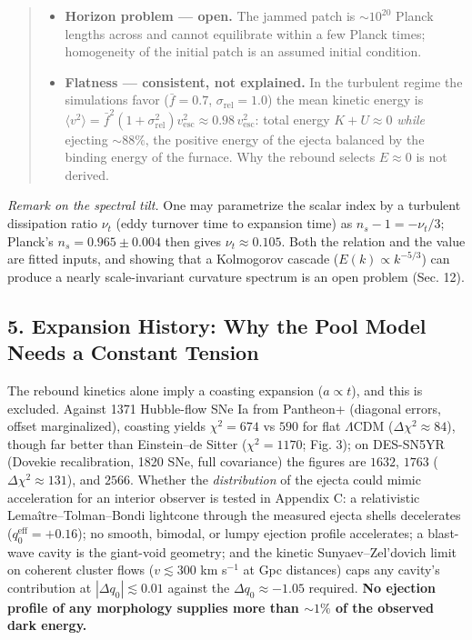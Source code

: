 \documentclass[
]{article}
\providecommand{\tightlist}{%
  \setlength{\itemsep}{0pt}\setlength{\parskip}{0pt}}
\begin{document}
\begin{quote}
\begin{itemize}
\tightlist
\item
  \textbf{Horizon problem --- open.} The jammed patch is
  \(\sim\!10^{20}\) Planck lengths across and cannot equilibrate within
  a few Planck times; homogeneity of the initial patch is an assumed
  initial condition.
\item
  \textbf{Flatness --- consistent, not explained.} In the turbulent
  regime the simulations favor (\(\bar{f} = 0.7\),
  \(\sigma_{\text{rel}} = 1.0\)) the mean kinetic energy is
  \(\langle v^2\rangle = \bar{f}^2(1+\sigma_{\text{rel}}^2)v_{\text{esc}}^2 \approx 0.98\,v_{\text{esc}}^2\):
  total energy \(K + U \approx 0\) \emph{while} ejecting \(\sim\!88\%\),
  the positive energy of the ejecta balanced by the binding energy of
  the furnace. Why the rebound selects \(E \approx 0\) is not derived.
\end{itemize}
\end{quote}

\emph{Remark on the spectral tilt.} One may parametrize the scalar index
by a turbulent dissipation ratio \(\nu_t\) (eddy turnover time to
expansion time) as \(n_s - 1 = -\nu_t/3\); Planck's
\(n_s = 0.965 \pm 0.004\) then gives \(\nu_t \approx 0.105\). Both the
relation and the value are fitted inputs, and showing that a Kolmogorov
cascade (\(E(k) \propto k^{-5/3}\)) can produce a nearly scale-invariant
curvature spectrum is an open problem (Sec. 12).

\hypertarget{expansion-history-why-the-pool-model-needs-a-constant-tension}{%
\subsection{\texorpdfstring{\textbf{5. Expansion History: Why the Pool
Model Needs a Constant
Tension}}{5. Expansion History: Why the Pool Model Needs a Constant Tension}}\label{expansion-history-why-the-pool-model-needs-a-constant-tension}}

The rebound kinetics alone imply a coasting expansion (\(a \propto t\)),
and this is excluded. Against 1371 Hubble-flow SNe Ia from Pantheon+
(diagonal errors, offset marginalized), coasting yields \(\chi^2 = 674\)
vs \(590\) for flat \(\Lambda\)CDM (\(\Delta\chi^2 \approx 84\)), though
far better than Einstein--de Sitter (\(\chi^2 = 1170\); Fig. 3); on
DES-SN5YR (Dovekie recalibration, 1820 SNe, full covariance) the figures
are \(1632\), \(1763\) (\(\Delta\chi^2 \approx 131\)), and \(2566\).
Whether the \emph{distribution} of the ejecta could mimic acceleration
for an interior observer is tested in Appendix C: a relativistic
Lemaître--Tolman--Bondi lightcone through the measured ejecta shells
decelerates (\(q_0^{\text{eff}} = +0.16\)); no smooth, bimodal, or lumpy
ejection profile accelerates; a blast-wave cavity is the giant-void
geometry; and the kinetic Sunyaev--Zel'dovich limit on coherent cluster
flows (\(v \lesssim 300\) km s\(^{-1}\) at Gpc distances) caps any
cavity's contribution at \(|\Delta q_0| \lesssim 0.01\) against the
\(\Delta q_0 \approx -1.05\) required. \textbf{No ejection profile of
any morphology supplies more than \(\sim\!1\%\) of the observed dark
energy.}
\end{document}
